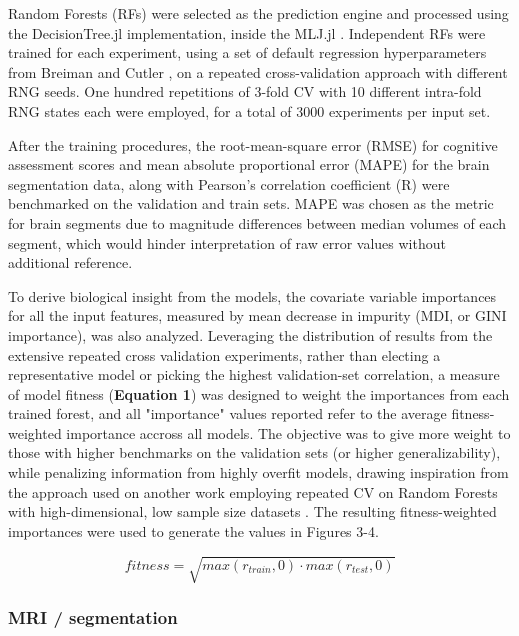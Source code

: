 \documentclass{article}
\begin{document}
Random Forests (RFs)
\cite{breimanRandomForests2001}
were selected as the prediction engine and processed using the
DecisionTree.jl \cite{sadeghiDecisionTreeJlJulia2022}
implementation, inside the MLJ.jl \cite{blaomMLJJuliaPackage2020}.
Independent RFs were trained for each
experiment, using a set of default regression hyperparameters from
Breiman and Cutler \cite{breimanRandomForests2001},
on a repeated cross-validation approach with different RNG seeds. One hundred
repetitions of 3-fold CV with 10 different intra-fold RNG states each
were employed, for a total of 3000 experiments per input set.

After the training procedures, the root-mean-square error (RMSE) for
cognitive assessment scores and mean absolute proportional error (MAPE)
for the brain segmentation data, along with Pearson's
correlation coefficient (R) were benchmarked on the validation and train
sets. MAPE was chosen as the metric for brain segments due to magnitude
differences between median volumes of each segment, which would hinder
interpretation of raw error values without additional reference.

To derive biological insight from the models, the covariate variable
importances for all the input features, measured by mean decrease in
impurity (MDI, or GINI importance), was also analyzed. Leveraging the
distribution of results from the extensive repeated cross validation
experiments, rather than electing a representative model or picking the
highest validation-set correlation, a measure of model fitness
(\textbf{Equation 1}) was designed to weight the importances from each
trained forest, and all "importance" values reported refer to 
the average fitness-weighted importance accross all models.
The objective was to give more weight to those with
higher benchmarks on the validation sets (or higher generalizability),
while penalizing information from highly overfit models, drawing
inspiration from the approach used on another work employing repeated CV
on Random Forests with high-dimensional, low sample size
datasets \cite{woodruffInflammationAutoreactivityDefine2022}.
The resulting fitness-weighted importances were used
to generate the values in Figures 3-4.

\begin{equation}
    fitness = \sqrt{max(r_{train}, 0) \cdot max(r_{test}, 0)}
\end{equation}


\subsubsection*{MRI / segmentation}
\end{document}
